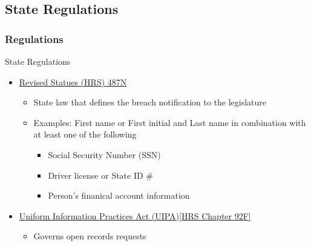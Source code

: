 \subsection{State Regulations}
\begin{frame}
  \frametitle{Regulations}
  \vspace{-5pt}
  \begin{block}{State Regulations}
    \begin{itemize}
    \item \href{https://www.capitol.hawaii.gov/hrscurrent/Vol11_Ch0476-0490/HRS0487N/HRS_0487N-.htm}{{\hawaii} Revised Statues (HRS) 487N}
      \begin{itemize}
      \item State law that defines the breach notification to the legislature
      \item Examples: First name or First initial and Last name in combination with at least one of the following
        \begin{itemize}
        \item Social Security Number (SSN)
        \item Driver license or State ID \#
        \item Person's finanical account information
          \end{itemize}
      \end{itemize}
    
    \item \href{https://www.capitol.hawaii.gov/hrscurrent/Vol02_Ch0046-0115/HRS0092F/HRS_0092F-.htm}{Uniform Information Practices Act (UIPA)[HRS Chapter 92F]}
      \begin{itemize}
      \item Governs open records requests
      \end{itemize}
    \end{itemize}
\end{block}
\end{frame}  




